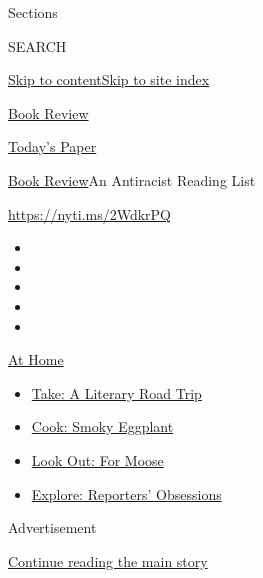 Sections

SEARCH

\protect\hyperlink{site-content}{Skip to
content}\protect\hyperlink{site-index}{Skip to site index}

\href{https://www.nytimes.com/section/books/review}{Book Review}

\href{https://myaccount.nytimes.com/auth/login?response_type=cookie\&client_id=vi}{}

\href{https://www.nytimes.com/section/todayspaper}{Today's Paper}

\href{/section/books/review}{Book Review}\textbar{}An Antiracist Reading
List

\url{https://nyti.ms/2WdkrPQ}

\begin{itemize}
\item
\item
\item
\item
\item
\end{itemize}

\href{https://www.nytimes.com/spotlight/at-home?action=click\&pgtype=Article\&state=default\&region=TOP_BANNER\&context=at_home_menu}{At
Home}

\begin{itemize}
\tightlist
\item
  \href{https://www.nytimes.com/2020/07/28/books/time-for-a-literary-road-trip.html?action=click\&pgtype=Article\&state=default\&region=TOP_BANNER\&context=at_home_menu}{Take:
  A Literary Road Trip}
\item
  \href{https://www.nytimes.com/2020/07/29/magazine/bored-with-your-home-cooking-some-smoky-eggplant-will-fix-that.html?action=click\&pgtype=Article\&state=default\&region=TOP_BANNER\&context=at_home_menu}{Cook:
  Smoky Eggplant}
\item
  \href{https://www.nytimes.com/2020/07/27/travel/moose-michigan-isle-royale.html?action=click\&pgtype=Article\&state=default\&region=TOP_BANNER\&context=at_home_menu}{Look
  Out: For Moose}
\item
  \href{https://www.nytimes.com/interactive/2020/at-home/even-more-reporters-editors-diaries-lists-recommendations.html?action=click\&pgtype=Article\&state=default\&region=TOP_BANNER\&context=at_home_menu}{Explore:
  Reporters' Obsessions}
\end{itemize}

Advertisement

\protect\hyperlink{after-top}{Continue reading the main story}

